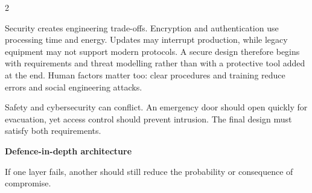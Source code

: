 \begin{multicols}{2}
\begin{ecarticle}
Security creates engineering trade-offs. Encryption and authentication use processing time and
energy. Updates may interrupt production, while legacy equipment may not support modern protocols.
A secure design therefore begins with requirements and threat modelling rather than with a protective
tool added at the end. Human factors matter too: clear procedures and training reduce errors and social
engineering attacks.
\end{ecarticle}

\begin{tcolorbox}[title=\sffamily\bfseries Did You Know?,colback=yellow!10,colframe=ECOrange]
Safety and cybersecurity can conflict. An emergency door should open quickly for evacuation, yet
access control should prevent intrusion. The final design must satisfy both requirements.
\end{tcolorbox}

\begin{engineeringfocus}
\textbf{Defence-in-depth architecture}

\begin{center}
\end{center}

If one layer fails, another should still reduce the probability or consequence of compromise.
\end{engineeringfocus}


\end{multicols}
